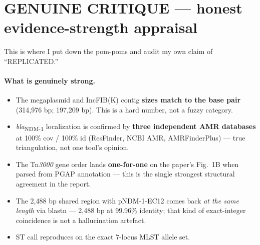 \documentclass[11pt]{article}
\begin{document}
\section{GENUINE CRITIQUE --- honest evidence-strength appraisal}
This is where I put down the pom-poms and audit my own claim of
``REPLICATED.''

\paragraph{What is genuinely strong.}
\begin{itemize}[leftmargin=1.5em,itemsep=2pt]
  \item The megaplasmid and IncFIB(K) contig \textbf{sizes match to the
    base pair} (314{,}976 bp; 197{,}209 bp). This is a hard number, not a
    fuzzy category.
  \item \emph{bla}\textsubscript{NDM-1} localization is confirmed by
    \textbf{three independent AMR databases} at 100\% cov / 100\% id
    (ResFinder, NCBI AMR, AMRFinderPlus) --- true triangulation, not one
    tool's opinion.
  \item The Tn\emph{3000} gene order lands \textbf{one-for-one} on the
    paper's Fig.~1B when parsed from PGAP annotation --- this is the
    single strongest structural agreement in the report.
  \item The 2{,}488 bp shared region with pNDM-1-EC12 comes back \emph{at
    the same length} via blastn --- 2{,}488 bp at 99.96\% identity; that
    kind of exact-integer coincidence is not a hallucination artefact.
  \item ST call reproduces on the exact 7-locus MLST allele set.
\end{itemize}
\end{document}
